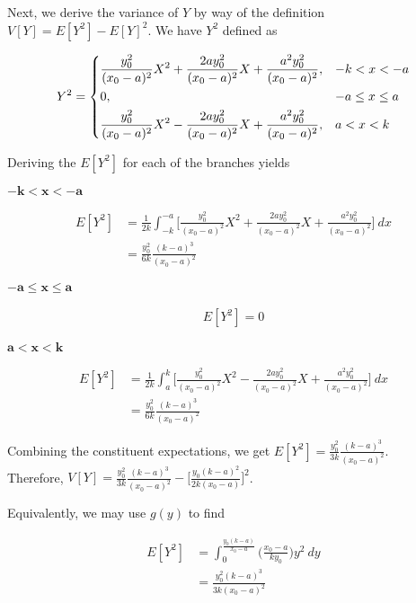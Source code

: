\documentclass[10pt, oneside]{article}   	%
\theoremstyle{definition}
\begin{document}
\begin{enumerate}[label=7.\arabic*]
\begin{enumerate}
	Next, we derive the variance of $Y$ by way of the definition $V[Y] = E[Y^2] - E[Y]^2$. We have $Y^2$ defined as
	
	\[ Y^2 = \begin{dcases}
	\frac{y^2_0}{(x_0 - a)^2} X^2 + \frac{2a y^2_0}{(x_0 - a)^2} X + \frac{a^2 y^2_0}{(x_0 - a)^2}, & -k < x < -a \\
	0, &-a \leq x \leq a \\
	\frac{y^2_0}{(x_0 - a)^2} X^2 - \frac{2ay^2_0}{(x_0 - a)^2} X + \frac{a^2 y^2_0}{(x_0 - a)^2}, &a < x < k
	\end{dcases} \]
	
	Deriving the $E[Y^2]$ for each of the branches yields
	
	$\bm{ -k < x < -a }$
	
	\begin{align*}
	E[Y^2] &= \frac{1}{2k} \int^{-a}_{-k} \Big[ \frac{y^2_0}{(x_0 - a)^2} X^2 + \frac{2a y^2_0}{(x_0 - a)^2} X + \frac{a^2 y^2_0}{(x_0 - a)^2} \Big] \ dx \\
	&= \frac{y^2_0}{6k} \frac{(k-a)^3}{(x_0 - a)^2}
	\end{align*}
	
	$\bm{-a \leq x \leq a}$
	
	\begin{align*}
	E[Y^2] = 0
	\end{align*}
	
	$\bm{a < x < k}$
	
	\begin{align*}
	E[Y^2] &= \frac{1}{2k} \int^k_a \Big[ \frac{y^2_0}{(x_0 - a)^2} X^2 - \frac{2ay^2_0}{(x_0 - a)^2} X + \frac{a^2 y^2_0}{(x_0 - a)^2} \Big] \ dx \\
	&= \boxed{ \frac{y^2_0}{6k} \frac{(k-a)^3}{(x_0 - a)^2} }
	\end{align*}
	
	Combining the constituent expectations, we get $\boxed{E[Y^2] = \frac{y^2_0}{3k} \frac{(k -a)^3}{(x_0 - a)^2} }$. \\
	Therefore, $\boxed{V[Y] = \frac{y^2_0}{3k} \frac{(k-a)^3}{(x_0 - a)^2} - \Big[ \frac{y_0 (k-a)^2}{2k (x_0 - a)} \Big]^2 }$.
	
	Equivalently, we may use $g(y)$ to find
	
	\begin{align*}
	E[Y^2] &= \int^{\frac{y_0 (k-a)}{x_0 - a}}_0 \Big( \frac{x_0 - a}{k y_0} \Big) y^2 \ dy \\
	&= \boxed{\frac{y^2_0 (k-a)^3}{3k (x_0 - a)^2}}
	\end{align*}


\end{enumerate}
\end{enumerate}
\end{document}
